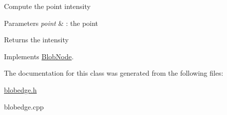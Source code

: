 Compute the point intensity


\begin{DoxyParams}{Parameters}
{\em point} & : the point \\
\hline
\end{DoxyParams}
\begin{DoxyReturn}{Returns}
the intensity 
\end{DoxyReturn}


Implements \hyperlink{class_blob_node_a4987f9060e9141647c514efd9859d0ba}{BlobNode}.



The documentation for this class was generated from the following files:\begin{DoxyCompactItemize}
\item 
\hyperlink{blobedge_8h}{blobedge.h}\item 
blobedge.cpp\end{DoxyCompactItemize}

